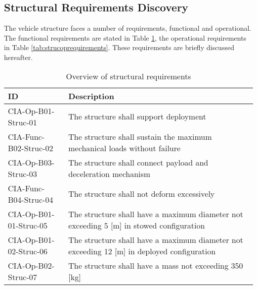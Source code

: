 \subsection{Structural Requirements Discovery} \label{sec:struct}
The vehicle structure faces a number of requirements, functional and operational. The functional requirements are stated in Table \ref{tab:strucfuncrequirements}, the operational requirements in Table \ref{tab:strucoprequirements}. These requirements are briefly discussed hereafter.
\begin{table}[H]
	\caption{Overview of structural requirements}
	\begin{tabular}{|p{}|p{}|}
    \hline
    ID          & Description                                                                                                      \\ \hline \hline
    CIA-Op-B01-Struc-01 & The structure shall support deployment \\ \hline
    CIA-Func-B02-Struc-02 & The structure shall sustain the maximum mechanical loads without failure                           \\ \hline
    CIA-Op-B03-Struc-03 & The structure shall connect payload and deceleration mechanism \\ \hline
    CIA-Func-B04-Struc-04 & The structure shall not deform excessively \\ \hline
    CIA-Op-B01-01-Struc-05 & The structure shall have a maximum diameter not exceeding 5 [m] in stowed configuration                              \\ \hline
    CIA-Op-B01-02-Struc-06 & The structure shall have a maximum diameter not exceeding 12 [m] in deployed configuration     \\ \hline
    CIA-Op-B02-Struc-07 & The structure shall have a mass not exceeding 350 [kg]\\ \hline
    \end{tabular}
    \label{tab:strucfuncrequirements}
\end{table}
